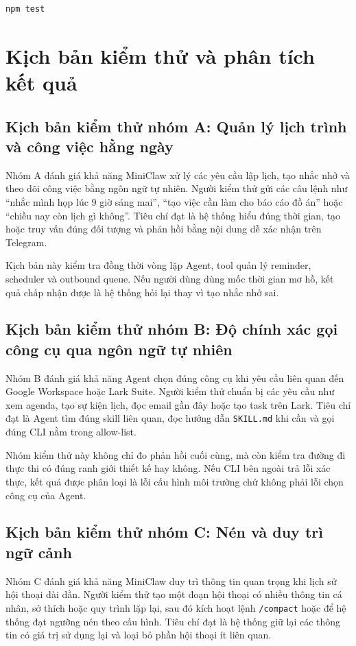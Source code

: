 \begin{lstlisting}[caption={Lệnh chạy bộ kiểm thử tự động.},label={lst:npm-test}]
npm test
\end{lstlisting}

\section{Kịch bản kiểm thử và phân tích kết quả}
\subsection{Kịch bản kiểm thử nhóm A: Quản lý lịch trình và công việc hằng ngày}
Nhóm A đánh giá khả năng MiniClaw xử lý các yêu cầu lập lịch, tạo nhắc nhở và theo dõi công việc bằng ngôn ngữ tự nhiên. Người kiểm thử gửi các câu lệnh như ``nhắc mình họp lúc 9 giờ sáng mai'', ``tạo việc cần làm cho báo cáo đồ án'' hoặc ``chiều nay còn lịch gì không''. Tiêu chí đạt là hệ thống hiểu đúng thời gian, tạo hoặc truy vấn đúng đối tượng và phản hồi bằng nội dung dễ xác nhận trên Telegram.

Kịch bản này kiểm tra đồng thời vòng lặp Agent, tool quản lý reminder, scheduler và outbound queue. Nếu người dùng dùng mốc thời gian mơ hồ, kết quả chấp nhận được là hệ thống hỏi lại thay vì tạo nhắc nhở sai.

\subsection{Kịch bản kiểm thử nhóm B: Độ chính xác gọi công cụ qua ngôn ngữ tự nhiên}
Nhóm B đánh giá khả năng Agent chọn đúng công cụ khi yêu cầu liên quan đến Google Workspace hoặc Lark Suite. Người kiểm thử chuẩn bị các yêu cầu như xem agenda, tạo sự kiện lịch, đọc email gần đây hoặc tạo task trên Lark. Tiêu chí đạt là Agent tìm đúng skill liên quan, đọc hướng dẫn \texttt{SKILL.md} khi cần và gọi đúng CLI nằm trong allow-list.

Nhóm kiểm thử này không chỉ đo phản hồi cuối cùng, mà còn kiểm tra đường đi thực thi có đúng ranh giới thiết kế hay không. Nếu CLI bên ngoài trả lỗi xác thực, kết quả được phân loại là lỗi cấu hình môi trường chứ không phải lỗi chọn công cụ của Agent.

\subsection{Kịch bản kiểm thử nhóm C: Nén và duy trì ngữ cảnh}
Nhóm C đánh giá khả năng MiniClaw duy trì thông tin quan trọng khi lịch sử hội thoại dài dần. Người kiểm thử tạo một đoạn hội thoại có nhiều thông tin cá nhân, sở thích hoặc quy trình lặp lại, sau đó kích hoạt lệnh \texttt{/compact} hoặc để hệ thống đạt ngưỡng nén theo cấu hình. Tiêu chí đạt là hệ thống giữ lại các thông tin có giá trị sử dụng lại và loại bỏ phần hội thoại ít liên quan.

